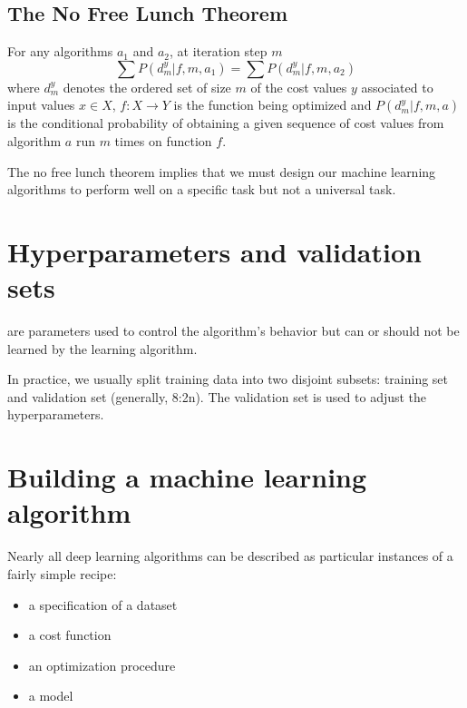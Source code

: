 \subsection{The No Free Lunch Theorem}


For any algorithms \(a_{1}\) and \(a_{2}\), at iteration step \(m\)
\begin{equation}
  \label{eq:1}
  \sum P(d_{m}^{y}|f,m,a_{1}) = \sum P(d_{m}^{y}|f,m,a_{2})
\end{equation}
where \(d_{m}^{y}\) denotes the ordered set of size \(m\) of the cost values \(y\) associated to input values \(x \in X\), \(f:X\longrightarrow Y\) is the function being optimized and \(P(d_{m}^{y}|f,m,a)\) is the conditional probability of obtaining a given sequence of cost values from algorithm \(a\) run \(m\) times on function \(f\).

The no free lunch theorem implies that we must design our machine learning algorithms to perform well on a specific task but not a universal task.


\section{Hyperparameters and validation sets}

 are parameters used to control the algorithm's behavior but can or should not be learned by the learning algorithm.


In practice, we usually split training data into two disjoint subsets: training set and validation set (generally, 8:2n).
The validation set is used to adjust the hyperparameters.




\section{Building a machine learning algorithm}

Nearly all deep learning algorithms can be described as particular instances of a fairly simple recipe:
\begin{itemize}
\item a specification of a dataset
\item a cost function
\item an optimization procedure
\item a model
\end{itemize}





